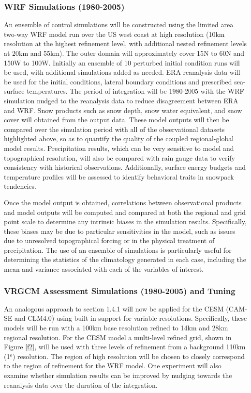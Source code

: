 \documentclass[11pt]{article}
\begin{document}
\subsubsection{WRF Simulations (1980-2005)}
An ensemble of control simulations will be constructed using the limited area two-way WRF model run over the US west coast at high resolution (10km resolution at the highest refinement level, with additional nested refinement levels at 20km and 55km). The outer domain will approximately cover 15N to 60N and 150W to 100W. Initially an ensemble of 10 perturbed initial condition runs will be used, with additional simulations added as needed. ERA reanalysis data will be used for the initial conditions, lateral boundary conditions and prescribed sea-surface temperatures. The period of integration will be 1980-2005 with the WRF simulation nudged to the reanalysis data to reduce disagreement between ERA and WRF. Snow products such as snow depth, snow water equivalent, and snow cover will obtained from the output data.  These model outputs will then be compared over the simulation period with all of the observational datasets highlighted above, so as to quantify the quality of the coupled regional-global model results. Precipitation results, which can be very sensitive to model and topographical resolution, will also be compared with rain gauge data to verify consistency with historical observations.  Additionally, surface energy budgets and temperature profiles will be assessed to identify behavioral traits in snowpack tendencies.

Once the model output is obtained, correlations between observational products and model outputs will be computed and compared at both the regional and grid point scale to determine any intrinsic biases in the simulation results. Specifically, these biases may be due to particular sensitivities in the model, such as issues due to unresolved topographical forcing or in the physical treatment of precipitation. The use of an ensemble of simulations is particularly useful for determining the statistics of the climatology generated in each case, including the mean and variance associated with each of the variables of interest.

\subsubsection{VRGCM Assessment Simulations (1980-2005) and Tuning}
An analogous approach to section 1.4.1 will now be applied  for  the  CESM  (CAM-SE and CLM4.0) using built-in support for variable resolutions.  Specifically, these models will be run with a 100km base resolution refined to 14km and 28km regional resolution. For the CESM model a multi-level refined grid, shown in Figure \ref{f2}, will be used with three levels of refinement from a background 110km (1$^{o}$) resolution. The region of high resolution will be chosen to closely correspond to the region of refinement for the WRF model.  One experiment will also examine whether simulation results can be improved by nudging towards the reanalysis data over the duration of the integration.
\end{document}
